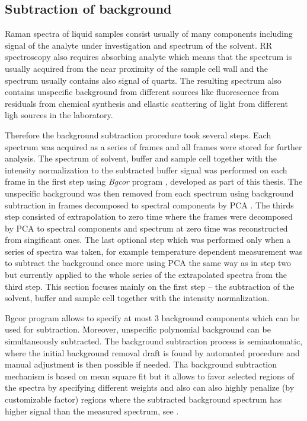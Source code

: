 \subsection{Subtraction of background}

Raman spectra of liquid samples consist usually of many components including
signal of the analyte under investigation and spectrum of the solvent.
RR spectroscopy also requires absorbing analyte which means that the spectrum
is usually acquired from the near proximity of the sample cell wall and the
spectrum usually contains also signal of quartz.
The resulting spectrum also contains unspecific background from different
sources like fluorescence from residuals from chemical synthesis and ellastic
scattering of light from different ligh sources in the laboratory.

Therefore the background subtraction procedure took several steps.
Each spectrum was acquired as a series of frames and all frames were stored
for further analysis.
The spectrum of solvent, buffer and sample cell together with the intensity
normalization to the subtracted buffer signal was performed on each frame in
the first step using \emph{Bgcor} program
\parencite{Bgcor2017},
developed as part of this thesis. The unspecific background was then removed
from each spectrum using background subtraction in frames decomposed to
spectral components by PCA
\parencite{Palacky2011}.
The thirds step consisted of extrapolation to zero time where the frames
were decomposed by PCA to spectral components and spectrum at zero time was
reconstructed from singificant ones.
The last optional step which was performed only when a series of spectra was
taken, for example temperature dependent measurement was to subtract the
background once more using PCA the same way as in step two but currently
applied to the whole series of the extrapolated spectra from the third step.
This section focuses mainly on the first step -- the subtraction of the
solvent, buffer and sample cell together with the intensity normalization.

Bgcor program allows to specify at most 3 background components which can be
used for subtraction. Moreover, unspecific polynomial background can be
simultaneously subtracted.
The background subtraction process is semiautomatic, where the initial
background removal draft is found by automated procedure and manual adjustment
is then possible if needed.
Tha background subtraction mechanism is based on mean square fit but it allows
to favor selected regions of the spectra by specifying different weights and
also can also highly penalize (by customizable factor) regions where the
subtracted background spectrum has higher signal than the measured spectrum,
see
.

